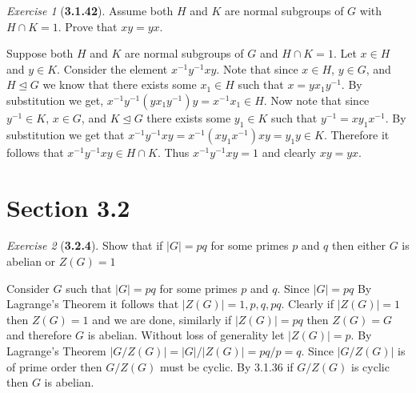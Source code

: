 \documentclass[12pt]{amsart}
\makeatletter
\theoremstyle{remark}
\newtheorem*{exercise}{Exercise}%
\renewenvironment{proof}[1][\proofname]{\par\doublespacing
  \pushQED{\qed}%
  \normalfont \topsep6\p@\@plus6\p@\relax
  \list{}{%
    \settowidth{\leftmargin}{\itshape\proofname:\hskip\labelsep}%
    \setlength{\labelwidth}{0pt}%
    \setlength{\itemindent}{-\leftmargin}%
  }%
  \item[\hskip\labelsep\itshape#1\@addpunct{:}]\ignorespaces
}{%
  \popQED\endlist\@endpefalse
  \singlespacing
}
\theoremstyle{mycomment}
\makeatother
\begin{document}
\begin{exercise}[\textbf{3.1.42}] Assume both $H$ and $K$ are normal subgroups of $G$ with $H \cap K = 1$. Prove that $xy = yx$.
  \begin{proof} Suppose both $H$ and $K$ are normal subgroups of $G$ and $H \cap K = 1$. Let $x \in H$ and $y \in K$. Consider the element $x^{-1}y^{-1}xy$. Note that since $x \in H$,  $y \in G$, and $H \trianglelefteq G$ we know that there exists some $x_1 \in H$ such that $x = yx_1y^{-1}$. By substitution we get, $x^{-1}y^{-1}(yx_1y^{-1})y = x^{-1}x_1 \in H$. Now note that since $y^{-1} \in K$, $x \in G$, and $K \trianglelefteq G$ there exists some $y_1 \in K$ such that $y^{-1} = xy_1x^{-1}$. By substitution we get that $x^{-1}y^{-1}xy = x^{-1}(xy_1x^{-1})xy = y_1y \in K$. Therefore it follows that $x^{-1}y^{-1}xy \in H \cap K$. Thus $x^{-1}y^{-1}xy = 1$ and clearly $xy = yx$. 
  \end{proof}
\end{exercise}
\vspace{.15in}


\section*{\textbf{Section 3.2}}


\begin{exercise}[\textbf{3.2.4}]Show that if $|G| = pq$ for some primes $p$ and $q$ then either $G$ is abelian or $Z(G) = 1$\\
  \begin{proof} Consider $G$ such that $|G| = pq$ for some primes $p$ and $q$. Since $|G| = pq$ By Lagrange's Theorem it follows that $|Z(G)| = 1, p, q, pq$. Clearly if $|Z(G)| = 1$ then $Z(G) = 1$ and we are done, similarly if $|Z(G)| = pq$ then $Z(G) = G$ and therefore $G$ is abelian. Without
    loss of generality let $|Z(G)| = p$. By Lagrange's Theorem $|G/Z(G)| = |G|/|Z(G)| = pq/p = q$. Since $|G/Z(G)|$ is of prime order then $G/Z(G)$ must be cyclic. By 3.1.36 if $G/Z(G)$ is cyclic then $G$ is abelian. 
    \end{proof}
\end{exercise}
\vspace{.15in}
\end{document}

